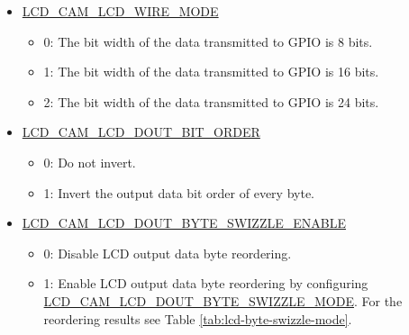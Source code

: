\documentclass[main\_\_EN.tex]{subfiles}
\begin{document}
\begin{itemize}
    \item \hyperref[fielddesc:LCDCAMLCDWIREMODE]{LCD\_CAM\_LCD\_WIRE\_MODE}
    \begin{itemize}
        \item 0: The bit width of the data transmitted to GPIO is 8 bits.
        \item 1: The bit width of the data transmitted to GPIO is 16 bits.
        \item 2: The bit width of the data transmitted to GPIO is 24 bits.
    \end{itemize}
    \item \hyperref[fielddesc:LCDCAMLCDDOUTBITORDER]{LCD\_CAM\_LCD\_DOUT\_BIT\_ORDER}
    \begin{itemize}
        \item 0: Do not invert.
        \item 1: Invert the output data bit order of every byte.
    \end{itemize}
    \item \hyperref[fielddesc:LCDCAMLCDDOUTBYTESWIZZLEENABLE]{LCD\_CAM\_LCD\_DOUT\_BYTE\_SWIZZLE\_ENABLE}
    \begin{itemize}
        \item 0: Disable LCD output data byte reordering.
        \item 1: Enable LCD output data byte reordering by configuring \hyperref[fielddesc:LCDCAMLCDDOUTBYTESWIZZLEMODE]{LCD\_CAM\_LCD\_DOUT\_BYTE\_SWIZZLE\_MODE}. For the reordering results see Table \ref{tab:lcd-byte-swizzle-mode}.
    \end{itemize}
\end{itemize}
\end{document}
